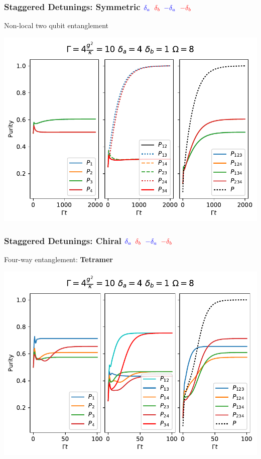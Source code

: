 \documentclass{beamer}
\begin{document}
\begin{frame}
\frametitle{Staggered Detunings: Symmetric \hspace{.5in} $\textcolor{blue}{\delta_a}$ $\textcolor{red}{\delta_b}$ $\textcolor{blue}{-\delta_a}$ $\textcolor{red}{-\delta_b}$}


Non-local two qubit entanglement

\centering

\includegraphics[scale=.7]{Sym_Stag.pdf}
\end{frame}

\begin{frame}
\frametitle{Staggered Detunings: Chiral \hspace{.5in} $\textcolor{blue}{\delta_a}$ $\textcolor{red}{\delta_b}$ $\textcolor{blue}{-\delta_a}$ $\textcolor{red}{-\delta_b}$}

Four-way entanglement: \textbf{Tetramer}

\centering

\includegraphics[scale=0.7]{Chiral_Stag.pdf}
\end{frame}
\end{document}
